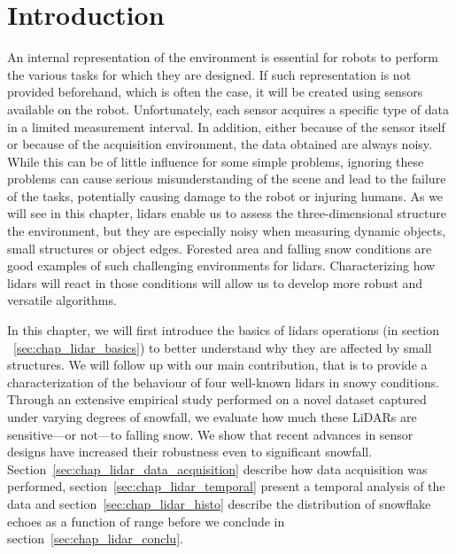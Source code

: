 \section{Introduction}
\label{sec:chap_lidar_intro}

An internal representation of the environment is essential for robots to perform the various tasks for which they are designed. If such representation is not provided beforehand, which is often the case, it will be created using sensors available on the robot. Unfortunately, each sensor acquires a specific type of data in a limited measurement interval. In addition, either because of the sensor itself or because of the acquisition environment, the data obtained are always noisy. While this can be of little influence for some simple problems, ignoring these problems can cause serious misunderstanding of the scene and lead to the failure of the tasks, potentially causing damage to the robot or injuring humans. As we will see in this chapter, \gls*{lidar}s enable us to assess the three-dimensional structure the environment, but they are especially noisy when measuring dynamic objects, small structures or object edges. Forested area and falling snow conditions are good examples of such challenging environments for \gls*{lidar}s. Characterizing how \gls*{lidar}s will react in those conditions will allow us to develop more robust and versatile algorithms.

In this chapter, we will first introduce the basics of \gls*{lidar}s operations (in section ~\ref{sec:chap_lidar_basics}) to better understand why they are affected by small structures. We will follow up with our main contribution, that is to provide a characterization of the behaviour of four well-known \gls*{lidar}s in snowy conditions. Through an extensive empirical study performed on a novel dataset captured under varying degrees of snowfall, we evaluate how much these LiDARs are sensitive---or not---to falling snow. We show that recent advances in sensor designs have increased their robustness even to significant snowfall. Section~\ref{sec:chap_lidar_data_acquisition} describe how data acquisition was performed, section~\ref{sec:chap_lidar_temporal} present a temporal analysis of the data and section~\ref{sec:chap_lidar_histo} describe the distribution of snowflake echoes as a function of range before we conclude in section~\ref{sec:chap_lidar_conclu}. 

